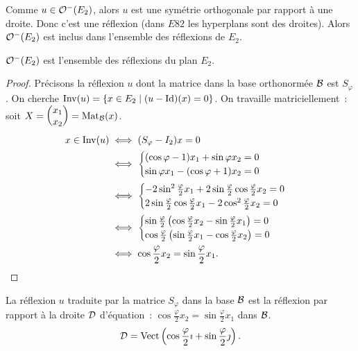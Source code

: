 Comme \(u \in \mathcal{O}^{-}\!\left(E_2\right)\), alors \(u\) est une symétrie orthogonale par 
rapport à une droite. Donc c'est une réflexion (dans \(E82\) les hyperplans 
sont des droites). Alors \(\mathcal{O}^{-}\!\left(E_2\right)\) est inclus dans l'ensemble des 
réflexions de \(E_2\).

\begin{theo}
  \(\mathcal{O}^{-}\!\left(E_2\right)\) est l'ensemble des réflexions du plan \(E_2\).
\end{theo}
\begin{proof}
  Précisons la réflexion \(u\) dont la matrice dans la base orthonormée 
  \(\mathcal{B}\) est \(S_\varphi\). On cherche \(\operatorname{Inv}(u)=\left\{x \in 
  E_2\mathrel{}\middle|\mathrel{}(u-\operatorname{Id})(x)=0\right\}\). On travaille matriciellement~: soit 
  \(X=\begin{pmatrix} x_1 \\ x_2 \end{pmatrix}=\mathrm{Mat}_{\mathcal{B}}(x)\).
    \begin{align}
      x \in \operatorname{Inv}(u) &\iff (S_\varphi-I_2)x=0 \\
      &\iff \begin{cases} (\cos \varphi -1)x_1 +\sin\varphi x_2 = 0 \\ 
      \sin\varphi x_1 -(\cos\varphi+1)x_2=0 \end{cases} \\
      &\iff \begin{cases} -2\sin^2\frac{\varphi}{2}x_1 
        +2\sin\frac{\varphi}{2}\cos\frac{\varphi}{2} x_2 = 0 \\ 
        2\sin\frac{\varphi}{2}\cos\frac{\varphi}{2} x_1 - 
      2\cos^2\frac{\varphi}{2}x_2 = 0 \end{cases} \\
      &\iff \begin{cases} \sin\frac{\varphi}{2} 
        \left(\cos\frac{\varphi}{2}x_2 - \sin\frac{\varphi}{2}x_1\right) = 0 
        \\ \cos\frac{\varphi}{2} \left(\sin\frac{\varphi}{2}x_1 - 
      \cos\frac{\varphi}{2}x_2\right) = 0\end{cases} \\
      &\iff \cos\frac{\varphi}{2} x_2 = \sin\frac{\varphi}{2}x_1.
    \end{align}
\end{proof}
\begin{prop}
  La réflexion \(u\) traduite par la matrice \(S_\varphi\) dans la base 
  \(\mathcal{B}\) est la réflexion par rapport à la droite \(\mathcal{D}\) d'équation~: 
  \(\cos\frac{\varphi}{2} x_2 = \sin\frac{\varphi}{2}x_1\) dans \(\mathcal{B}\).
  \begin{equation}
    \mathcal{D} = \operatorname{Vect}\left(\cos\frac{\varphi}{2}\imath + 
    \sin\frac{\varphi}{2}\jmath\right).
  \end{equation}
\end{prop}

